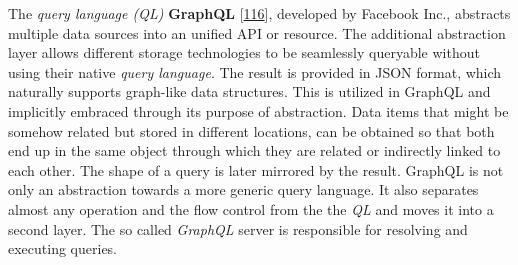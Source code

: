 \documentclass[12pt,english,a4paper,titlepage,cleardoublepage=empty,dottedtoc]{report}
\begin{document}
The \emph{query language (QL)}
\textbf{\protect\hypertarget{def--graphql}{}{GraphQL}}
{[}\protect\hyperlink{ref-web_spec_graphql}{116}{]}, developed by
Facebook Inc., abstracts multiple data sources into an unified API or
resource. The additional abstraction layer allows different storage
technologies to be seamlessly queryable without using their native
\emph{query language}. The result is provided in JSON format, which
naturally supports graph-like data structures. This is utilized in
GraphQL and implicitly embraced through its purpose of abstraction. Data
items that might be somehow related but stored in different locations,
can be obtained so that both end up in the same object through which
they are related or indirectly linked to each other. The shape of a
query is later mirrored by the result. GraphQL is not only an
abstraction towards a more generic query language. It also separates
almost any operation and the flow control from the the \emph{QL} and
moves it into a second layer. The so called \emph{GraphQL} server is
responsible for resolving and executing queries.
\end{document}
